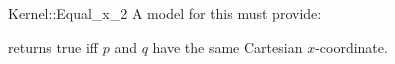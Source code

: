 \begin{ccRefFunctionObjectConcept}{Kernel::Equal_x_2}
A model for this must provide:


{returns true iff $p$ and $q$ have the same Cartesian $x$-coordinate.}

\end{ccRefFunctionObjectConcept}
